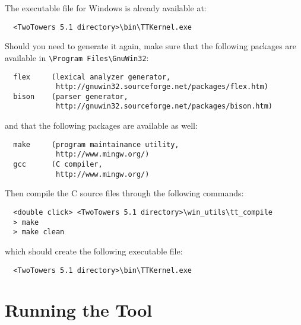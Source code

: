 The executable file for Windows is already available at:

	\begin{verbatim}
  <TwoTowers 5.1 directory>\bin\TTKernel.exe
	\end{verbatim}

\noindent
Should you need to generate it again, make sure that the following packages are available in \linebreak
\verb+\+\verb+Program Files\GnuWin32+:

	\begin{verbatim}
  flex     (lexical analyzer generator,
            http://gnuwin32.sourceforge.net/packages/flex.htm)
  bison    (parser generator,
            http://gnuwin32.sourceforge.net/packages/bison.htm)
	\end{verbatim}

\noindent
and that the following packages are available as well:

	\begin{verbatim}
  make     (program maintainance utility,
            http://www.mingw.org/)
  gcc      (C compiler,
            http://www.mingw.org/)
	\end{verbatim}

\noindent
Then compile the C source files through the following commands:

	\begin{verbatim}
  <double click> <TwoTowers 5.1 directory>\win_utils\tt_compile
  > make
  > make clean
	\end{verbatim}

\noindent
which should create the following executable file:

	\begin{verbatim}
  <TwoTowers 5.1 directory>\bin\TTKernel.exe
	\end{verbatim}



\section{Running the Tool}

